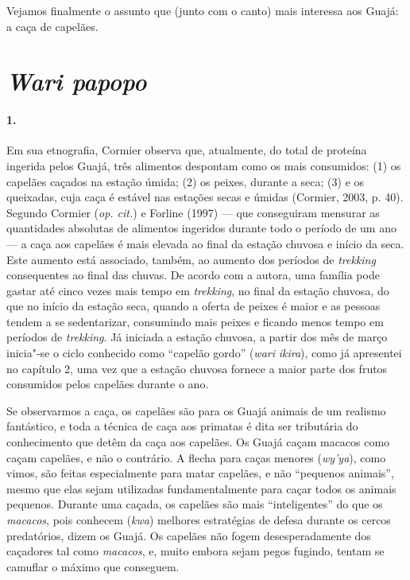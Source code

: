 Vejamos finalmente o assunto que (junto com o canto) mais interessa aos
Guajá: a caça de capelães.

\section{\emph{Wari papopo}}

\paragraph{1.}

Em sua etnografia, Cormier observa que, atualmente, do total de proteína
ingerida pelos Guajá, três alimentos despontam como os mais consumidos:
(1) os capelães caçados na estação úmida; (2) os peixes, durante a seca;
(3) e os queixadas, cuja caça é estável nas estações secas e úmidas
(Cormier, 2003, p. 40). Segundo Cormier (\emph{op. cit.}) e Forline (1997) --- que
conseguiram mensurar as quantidades absolutas de alimentos ingeridos
durante todo o período de um ano --- a caça aos capelães é mais elevada ao
final da estação chuvosa e início da seca. Este aumento está associado,
também, ao aumento dos períodos de \emph{trekking} consequentes ao final
das chuvas. De acordo com a autora, uma família pode gastar até cinco
vezes mais tempo em \emph{trekking}, no final da estação chuvosa, do que
no início da estação seca, quando a oferta de peixes é maior e as
pessoas tendem a se sedentarizar, consumindo mais peixes e ficando menos
tempo em períodos de \emph{trekking}. Já iniciada a estação chuvosa, a
partir dos mês de março inicia"-se o ciclo conhecido como ``capelão gordo''
(\emph{wari} \emph{ikira}), como já apresentei no capítulo 2, uma vez
que a estação chuvosa fornece a maior parte dos frutos consumidos pelos
capelães durante o ano.

Se observarmos a caça, os capelães são para os Guajá animais de um
realismo fantástico, e toda a técnica de caça aos primatas é dita ser
tributária do conhecimento que detêm da caça aos capelães. Os Guajá
caçam macacos como caçam capelães, e não o contrário. A flecha para
caças menores (\emph{wy'ya}), como vimos, são feitas especialmente para
matar capelães, e não ``pequenos animais'', mesmo que elas sejam
utilizadas fundamentalmente para caçar todos os animais pequenos.
Durante uma caçada, os capelães são mais ``inteligentes'' do que os
\emph{macacos}, pois conhecem (\emph{kwa}) melhores estratégias de
defesa durante os cercos predatórios, dizem os Guajá. Os capelães não
fogem desesperadamente dos caçadores tal como \emph{macacos}, e, muito
embora sejam pegos fugindo, tentam se camuflar o máximo que conseguem.


